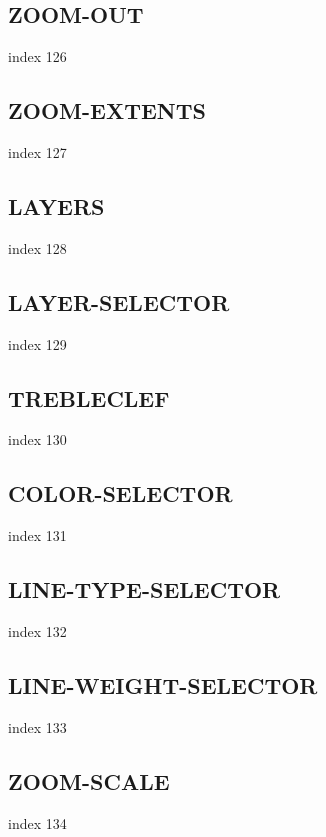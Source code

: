 \documentclass[a4paper]{report}
\begin{document}
{{{{{{{{{{{{{\subsection{ZOOM-OUT}

index 126

\subsection{ZOOM-EXTENTS}

index 127

\subsection{LAYERS}

index 128

\subsection{LAYER-SELECTOR}

index 129

\subsection{TREBLECLEF}

index 130

\subsection{COLOR-SELECTOR}

index 131

\subsection{LINE-TYPE-SELECTOR}

index 132

\subsection{LINE-WEIGHT-SELECTOR}

index 133

\subsection{ZOOM-SCALE}

index 134

}}}}}}}}}}}}}
\end{document}

